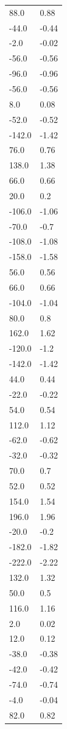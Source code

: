 \begin{longtable}{ll}
88.0 & 0.88 \\
-44.0 & -0.44 \\
-2.0 & -0.02 \\
-56.0 & -0.56 \\
-96.0 & -0.96 \\
-56.0 & -0.56 \\
8.0 & 0.08 \\
-52.0 & -0.52 \\
-142.0 & -1.42 \\
76.0 & 0.76 \\
138.0 & 1.38 \\
66.0 & 0.66 \\
20.0 & 0.2 \\
-106.0 & -1.06 \\
-70.0 & -0.7 \\
-108.0 & -1.08 \\
-158.0 & -1.58 \\
56.0 & 0.56 \\
66.0 & 0.66 \\
-104.0 & -1.04 \\
80.0 & 0.8 \\
162.0 & 1.62 \\
-120.0 & -1.2 \\
-142.0 & -1.42 \\
44.0 & 0.44 \\
-22.0 & -0.22 \\
54.0 & 0.54 \\
112.0 & 1.12 \\
-62.0 & -0.62 \\
-32.0 & -0.32 \\
70.0 & 0.7 \\
52.0 & 0.52 \\
154.0 & 1.54 \\
196.0 & 1.96 \\
-20.0 & -0.2 \\
-182.0 & -1.82 \\
-222.0 & -2.22 \\
132.0 & 1.32 \\
50.0 & 0.5 \\
116.0 & 1.16 \\
2.0 & 0.02 \\
12.0 & 0.12 \\
-38.0 & -0.38 \\
-42.0 & -0.42 \\
-74.0 & -0.74 \\
-4.0 & -0.04 \\
82.0 & 0.82 \\

\end{longtable}
